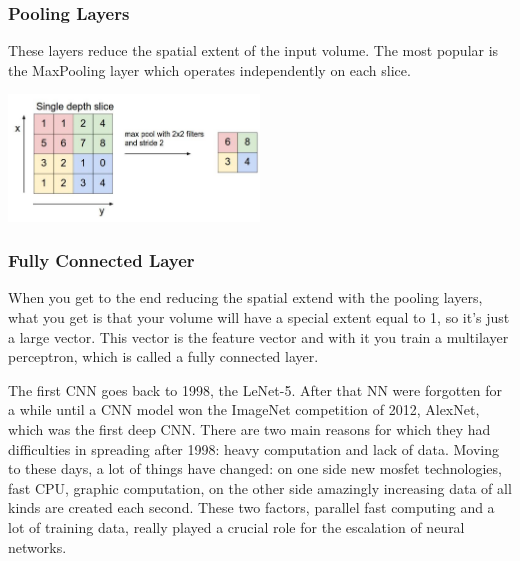 \subsubsection{Pooling Layers}
These layers reduce the spatial extent of the input volume. The most popular is the MaxPooling layer which operates independently on each slice. 
\begin{center}
    \includegraphics[width=0.5\textwidth]{images_CNN/maxpool.PNG}\par
\end{center}

\subsubsection{Fully Connected Layer}
When you get to the end reducing the spatial extend with the pooling layers, what you get is that your volume will have a special extent equal to 1, so it's just a large vector. This vector is the feature vector and with it you train a multilayer perceptron, which is called a fully connected layer.

\vspace{1cm}

The first CNN goes back to 1998, the LeNet-5. After that NN were forgotten for a while until a CNN model won the ImageNet competition of 2012, AlexNet, which was the first deep CNN. There are two main reasons for which they had difficulties in spreading after 1998: heavy computation and lack of data. Moving to these days, a lot of things have changed: on one side new mosfet technologies, fast CPU, graphic computation, on the other side amazingly increasing data of all kinds are created each second. These two factors, parallel fast computing and a lot of training data, really played a crucial role for the escalation of neural networks.